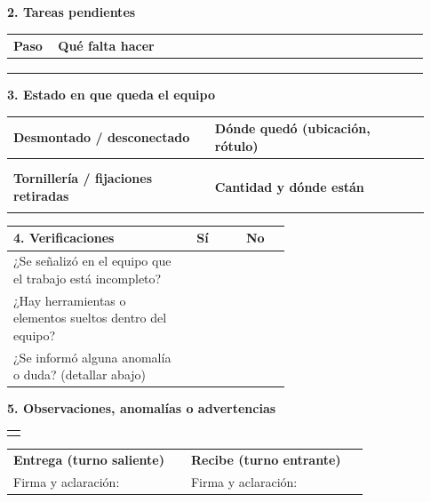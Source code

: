 \vspace{5pt}
\noindent\textbf{2. Tareas pendientes}\\[2pt]
\begin{tabular}{|p{0.10\linewidth}|p{0.83\linewidth}|}
\hline
\textbf{Paso} & \textbf{Qué falta hacer} \\ \hline
 & \\ \hline
 & \\ \hline
 & \\ \hline
\end{tabular}

\vspace{5pt}
\noindent\textbf{3. Estado en que queda el equipo}\\[2pt]
\begin{tabular}{|p{0.45\linewidth}|p{0.48\linewidth}|}
\hline
\textbf{Desmontado / desconectado} & \textbf{Dónde quedó (ubicación, rótulo)} \\ \hline
 & \\ \hline
 & \\ \hline
\textbf{Tornillería / fijaciones retiradas} & \textbf{Cantidad y dónde están} \\ \hline
 & \\ \hline
\end{tabular}

\vspace{5pt}
\noindent
\begin{tabular}{|p{0.62\linewidth}|c|c|}
\hline
\textbf{4. Verificaciones} & \textbf{Sí} & \textbf{No} \\ \hline
¿Se señalizó en el equipo que el trabajo está incompleto? & \hspace{0.6cm} & \hspace{0.6cm} \\ \hline
¿Hay herramientas o elementos sueltos dentro del equipo? & & \\ \hline
¿Se informó alguna anomalía o duda? (detallar abajo) & & \\ \hline
\end{tabular}

\vspace{5pt}
\noindent\textbf{5. Observaciones, anomalías o advertencias}\\[2pt]
\begin{tabular}{|p{0.955\linewidth}|}
\hline
\\ \hline
\\ \hline
\end{tabular}

\vspace{10pt}
\noindent
\begin{tabular}{|p{0.46\linewidth}|p{0.46\linewidth}|}
\hline
\textbf{Entrega (turno saliente)} & \textbf{Recibe (turno entrante)} \\
Firma y aclaración: & Firma y aclaración: \\[14pt] \hline
\end{tabular}
\renewcommand{\arraystretch}{1.15}


